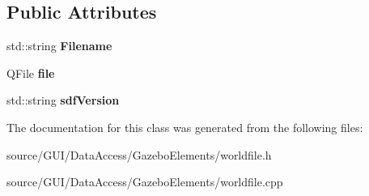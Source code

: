 \subsection*{Public Attributes}
\begin{DoxyCompactItemize}
\item 
std\+::string {\bfseries Filename}\label{class_world_file_a9152a151425514f3039fac8b1a3488ec}

\item 
Q\+File {\bfseries file}\label{class_world_file_aa3c6dcbe011a0a8b610b5de3135a813b}

\item 
std\+::string {\bfseries sdf\+Version}\label{class_world_file_a20e90a5934df3f6c619f9e80aee541c9}

\end{DoxyCompactItemize}


The documentation for this class was generated from the following files\+:\begin{DoxyCompactItemize}
\item 
source/\+G\+U\+I/\+Data\+Access/\+Gazebo\+Elements/worldfile.\+h\item 
source/\+G\+U\+I/\+Data\+Access/\+Gazebo\+Elements/worldfile.\+cpp\end{DoxyCompactItemize}
